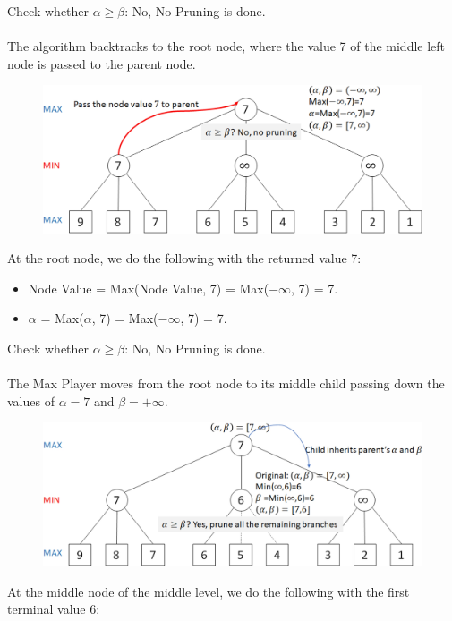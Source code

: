\documentclass{book}
\begin{document}
Check whether $\alpha \geq \beta$: No, No Pruning is done.\\
\vspace{1mm}
\\
The algorithm backtracks to the root node, where the value 7 of the middle left node is passed to the parent node.\\
\begin{figure}
    \includegraphics[scale=0.09]{chapter 10/ch10_figure7.jpeg}
\end{figure}
At the root node, we do the following with the returned value 7:
\begin{itemize}
    \item Node Value = Max(Node Value, 7) = Max($-\infty$, 7) = 7.
    \item $\alpha$ = Max($\alpha$, 7) = Max($-\infty$, 7) = 7.
\end{itemize}
Check whether $\alpha \geq \beta$: No, No Pruning is done.\\
\vspace{1.2cm}
\\
The Max Player moves from the root node to its middle child passing down the values of $\alpha = 7$ and $\beta = +\infty$.\\
\begin{figure}
    \includegraphics[scale=0.09]{chapter 10/ch10_figure8.jpeg}
\end{figure}
At the middle node of the middle level, we do the following with the first terminal value 6:
\end{document}
